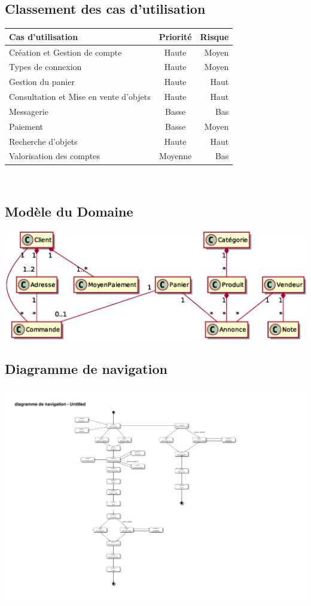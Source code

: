  	\subsection{Classement des cas d'utilisation} 
 	{\renewcommand{\arraystretch}{1.5} %
 	{\setlength{\tabcolsep}{1cm} %
	\begin{tabular}{|l|c|r|}
		\hline
		\textbf{Cas d'utilisation} & \textbf{Priorité} & \textbf{Risque} \\
		\hline
		Création et Gestion de compte & Haute & Moyen \\
		\hline
		Types de connexion & Haute & Moyen \\
		\hline
		Gestion du panier & Haute & Haut \\
		\hline
		Consultation et Mise en vente d'objets & Haute & Haut \\
		\hline
		Messagerie & Basse & Bas \\
		\hline
		Paiement & Basse & Moyen \\
		\hline
		Recherche d'objets & Haute & Haut \\
		\hline
		Valorisation des comptes & Moyenne & Bas \\
		\hline
	\end{tabular} \\
	\subsection{Modèle du Domaine}
	\includegraphics[width=15cm]{Images/MD} 

	\subsection{Diagramme de navigation}
	
	\includegraphics[trim = 6cm 1.5cm 5cm 2.2cm, clip]{Images/DN}
	
}}
